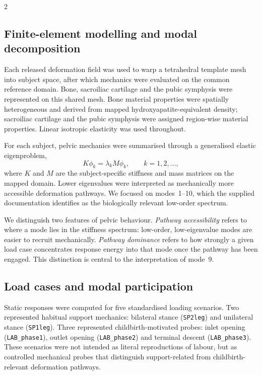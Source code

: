 \documentclass[openacc]{rsproca_new}
\begin{document}
\begin{multicols}{2}
\subsection{Finite-element modelling and modal decomposition}

Each released deformation field was used to warp a tetrahedral template mesh into subject space, after which mechanics were evaluated on the common reference domain. Bone, sacroiliac cartilage and the pubic symphysis were represented on this shared mesh. Bone material properties were spatially heterogeneous and derived from mapped hydroxyapatite-equivalent density; sacroiliac cartilage and the pubic symphysis were assigned region-wise material properties. Linear isotropic elasticity was used throughout.

For each subject, pelvic mechanics were summarised through a generalised elastic eigenproblem,
\begin{equation}
K\phi_{k} = \lambda_{k} M\phi_{k}, \qquad k=1,2,\ldots,
\end{equation}
where $K$ and $M$ are the subject-specific stiffness and mass matrices on the mapped domain. Lower eigenvalues were interpreted as mechanically more accessible deformation pathways. We focused on modes~1--10, which the supplied documentation identifies as the biologically relevant low-order spectrum.

We distinguish two features of pelvic behaviour. \emph{Pathway accessibility} refers to where a mode lies in the stiffness spectrum: low-order, low-eigenvalue modes are easier to recruit mechanically. \emph{Pathway dominance} refers to how strongly a given load case concentrates response energy into that mode once the pathway has been engaged. This distinction is central to the interpretation of mode~9.

\subsection{Load cases and modal participation}

Static responses were computed for five standardised loading scenarios. Two represented habitual support mechanics: bilateral stance (\texttt{SP2leg}) and unilateral stance (\texttt{SP1leg}). Three represented childbirth-motivated probes: inlet opening (\texttt{LAB\_phase1}), outlet opening (\texttt{LAB\_phase2}) and terminal descent (\texttt{LAB\_phase3}). These scenarios were not intended as literal reproductions of labour, but as controlled mechanical probes that distinguish support-related from childbirth-relevant deformation pathways.


\end{multicols}
\end{document}
